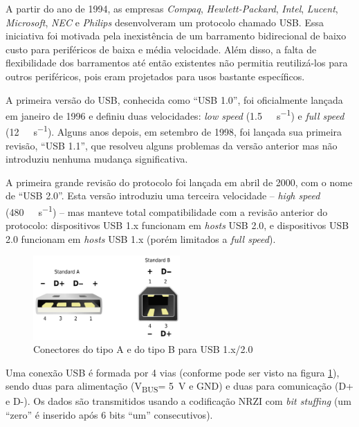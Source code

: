 \documentclass[brazil,pagestart=firstchapter]{abnt}
\newcommand*{\VBUS}{V\textsubscript{BUS}\xspace}
\newcommand*{\GND}{GND\xspace}
\begin{document}
A partir do ano de 1994, as empresas \textit{Compaq},
\textit{Hewlett-Packard}, \textit{Intel}, \textit{Lucent},
\textit{Microsoft}, \textit{NEC} e \textit{Philips} desenvolveram um
protocolo chamado \ac{USB}. Essa iniciativa foi motivada pela inexistência
de um barramento bidirecional de baixo custo para periféricos de baixa e
média velocidade. Além disso, a falta de flexibilidade dos barramentos até
então existentes não permitia reutilizá-los para outros periféricos, pois
eram projetados para usos bastante específicos. \cite{usb20}

A primeira versão do \ac{USB}, conhecida como ``USB 1.0'', foi oficialmente
lançada em janeiro de 1996 e definiu duas velocidades: \textit{low speed}
(\SI{1.5}{\mega\bit\per\second}) e \textit{full speed}
(\SI{12}{\mega\bit\per\second}). Alguns anos depois, em setembro de 1998, foi
lançada sua primeira revisão, ``USB 1.1'', que resolveu alguns problemas da
versão anterior mas não introduziu nenhuma mudança significativa.

A primeira grande revisão do protocolo foi lançada em abril de 2000, com o
nome de ``USB 2.0''. Esta versão introduziu uma terceira velocidade --
\textit{high speed} (\SI{480}{\mega\bit\per\second}) -- mas manteve total
compatibilidade com a revisão anterior do protocolo: dispositivos USB 1.x
funcionam em \textit{hosts} USB 2.0, e dispositivos USB 2.0 funcionam em
\textit{hosts} USB 1.x (porém limitados a \textit{full speed}).

\begin{figure}[h]
\centering
\includegraphics[width=0.5\textwidth]{img/USB.png}
\caption{Conectores do tipo A e do tipo B para USB 1.x/2.0}
\label{fig:usb_connectors}
\end{figure}

Uma conexão \ac{USB} é formada por 4 vias (conforme pode ser visto na figura
\ref{fig:usb_connectors}), sendo duas para alimentação (\VBUS =
\SI{+5}{\volt} e \GND) e duas para comunicação (D+ e D-). Os dados são
transmitidos usando a codificação \ac{NRZI} com \textit{bit stuffing} (um
``zero'' é inserido após 6 bits ``um'' consecutivos). \cite[p.~157]{usb20}
\cite[cap.~2]{usbinanutshell}
\end{document}
